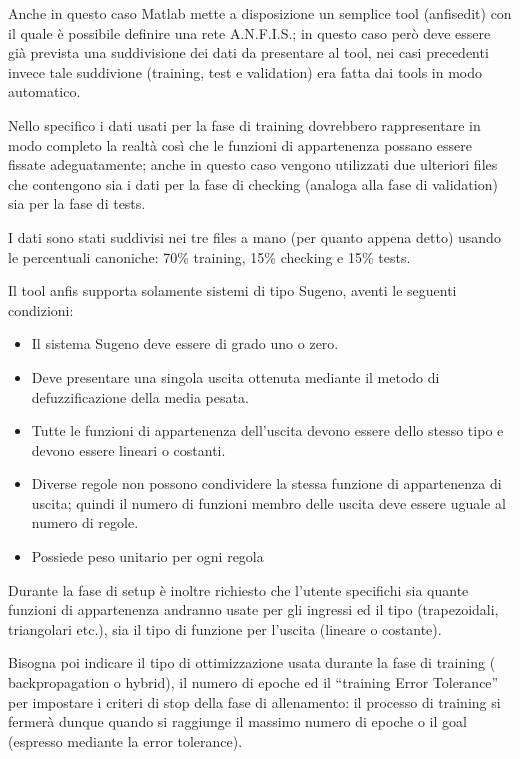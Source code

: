 Anche in questo caso Matlab mette a disposizione un semplice tool (anfisedit) con il quale è possibile definire una rete A.N.F.I.S.; in questo caso però deve essere già prevista una suddivisione dei dati da presentare al tool, nei casi precedenti invece tale suddivione (training, test e validation) era fatta dai tools in modo automatico.

Nello specifico i dati usati per la fase di training dovrebbero rappresentare in modo completo la realtà così che le funzioni di appartenenza possano essere fissate adeguatamente; anche in questo caso vengono utilizzati due ulteriori files che contengono sia i dati per la fase di checking (analoga alla fase di validation) sia per la fase di tests.

I dati sono stati suddivisi nei tre files a mano (per quanto appena detto) usando le percentuali canoniche: 70\% training, 15\% checking e 15\% tests.

Il tool anfis supporta solamente sistemi di tipo Sugeno, aventi le seguenti condizioni:

\begin{itemize}
  \item Il sistema Sugeno deve essere di grado uno o zero.
  \item Deve presentare una singola uscita ottenuta mediante il metodo di defuzzificazione della media pesata.
  \item Tutte le funzioni di appartenenza dell'uscita devono essere dello stesso tipo e devono essere lineari o costanti.
  \item Diverse regole non possono condividere la stessa funzione di appartenenza di uscita; quindi il numero di funzioni membro delle uscita deve essere uguale al numero di regole.
  \item Possiede peso unitario per ogni regola %
\end{itemize}

Durante la fase di setup è inoltre richiesto che l'utente specifichi sia quante funzioni di appartenenza andranno usate per gli ingressi ed il tipo (trapezoidali, triangolari etc.), sia il tipo di funzione per l'uscita (lineare o costante).

Bisogna poi indicare il tipo di ottimizzazione usata durante la fase di training ( backpropagation o hybrid), il numero di epoche ed il “training Error Tolerance” per impostare i criteri di stop della fase di allenamento: il processo di training si fermerà dunque quando si raggiunge il massimo numero di epoche o il goal (espresso mediante la error tolerance).


